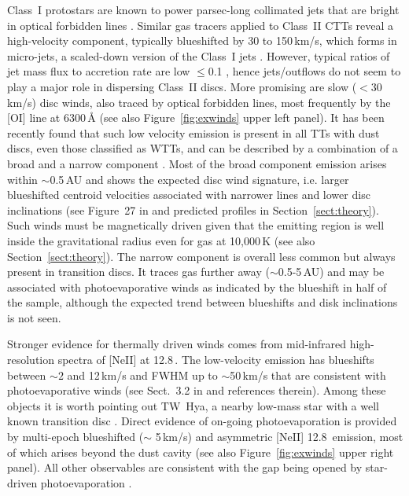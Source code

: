 \documentclass{rsos}
\begin{document}
Class~I protostars are known to power parsec-long collimated jets that are bright in optical forbidden lines 
\cite{2001ARA&A..39..403R}. Similar gas tracers applied to Class~II CTTs reveal a high-velocity component, typically blueshifted by 30 to 150\,km/s, which forms in micro-jets, a scaled-down version of the Class~I jets 
\cite{2007prpl.conf..231R}. However, typical ratios of jet mass flux to accretion rate are low $\le$0.1 
\cite{2007IAUS..243..203C,2004ApJ...616..998W}, hence jets/outflows do not seem to play a major role in dispersing Class~II discs. More promising are slow ($<$30\,km/s) disc winds, also traced by optical forbidden lines, most frequently by the [OI] line at 6300\,\AA{} 
\cite{1995ApJ...452..736H,2013ApJ...772...60R,2014A&A...569A...5N} (see also Figure~\ref{fig:exwinds} upper left panel). 
It has been recently found that such low velocity emission is present in all TTs with dust discs, even those classified as WTTs, and can be described by a combination of a broad and a narrow component \cite{2016ApJ...831..169S}. Most of the broad component emission arises within $\sim$0.5\,AU and shows the expected disc wind signature, i.e.  larger blueshifted centroid velocities associated with narrower lines and lower disc inclinations (see Figure~27 in \cite{2016ApJ...831..169S} and predicted profiles in Section~\ref{sect:theory}). Such winds must be magnetically driven given that the emitting region is well inside the gravitational radius even for gas at 10,000\,K (see also Section~\ref{sect:theory}). The narrow component is overall less common but always present in transition discs. It traces gas further away ($\sim$0.5-5\,AU) and may be associated with photoevaporative winds as indicated by the blueshift in half of the sample, although the expected trend between blueshifts and disk inclinations is not seen.

Stronger evidence for thermally driven winds comes from mid-infrared high-resolution spectra of [NeII] at 12.8\,\micron. The low-velocity emission has blueshifts between $\sim 2$ and 12\,km/s and FWHM up to $\sim$50\,km/s that are consistent with photoevaporative winds (see Sect.~3.2 in \cite{2014prpl.conf..475A} and references therein). Among these objects it is worth pointing out TW~Hya, a nearby low-mass star with a well known transition disc 
\cite{2016ApJ...820L..40A}. 
Direct evidence of on-going photoevaporation is provided by multi-epoch blueshifted ($\sim$ 5\,km/s) and asymmetric [NeII] 12.8\,\micron{} emission, most of which arises beyond the dust cavity \cite{2011ApJ...736...13P} (see also Figure~\ref{fig:exwinds} upper right panel). All other observables are consistent with the gap being opened by star-driven photoevaporation \cite{2016arXiv160903903E}.
\end{document}
